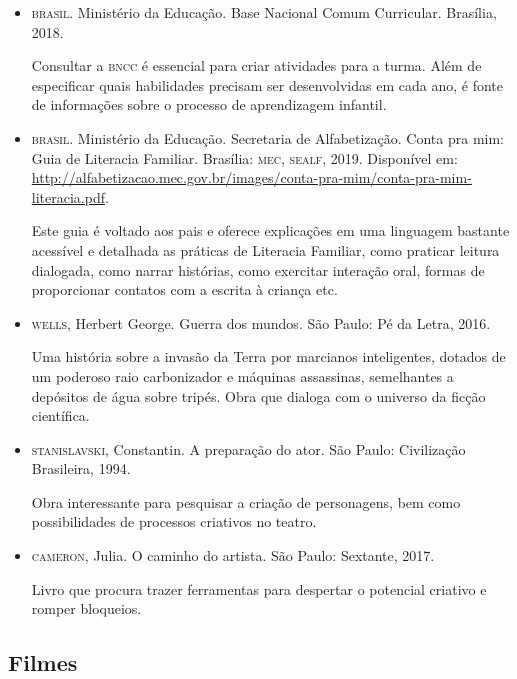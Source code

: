 \documentclass[11pt]{extarticle}
\begin{document}
\begin{itemize}
\item \textsc{brasil}. Ministério da Educação. Base Nacional Comum Curricular. Brasília, 2018.

Consultar a \textsc{bncc} é essencial para criar atividades para a turma. Além de especificar quais habilidades precisam ser desenvolvidas em cada ano, é fonte de informações sobre o processo de aprendizagem infantil. 

\item \textsc{brasil}. Ministério da Educação. Secretaria de Alfabetização. Conta pra mim: Guia de Literacia Familiar. 
Brasília: \textsc{mec, sealf}, 2019. Disponível em: \url{http://alfabetizacao.mec.gov.br/images/conta-pra-mim/conta-pra-mim-literacia.pdf}.

Este guia é voltado aos pais e oferece explicações em uma linguagem bastante acessível e detalhada as práticas de Literacia Familiar, como praticar leitura dialogada, como narrar histórias, como exercitar interação oral, formas de proporcionar contatos com a escrita à criança etc. 
 
\item \textsc{wells}, Herbert George. Guerra dos mundos. São Paulo: Pé da Letra, 2016.

Uma história sobre a invasão da Terra por marcianos inteligentes, dotados de um poderoso raio carbonizador e máquinas assassinas, semelhantes a depósitos de água sobre tripés. Obra que dialoga com o universo da ficção científica.

\item \textsc{stanislavski}, Constantin. A preparação do ator. São Paulo: Civilização Brasileira, 1994.

Obra interessante para pesquisar a criação de personagens, bem como possibilidades de processos criativos no teatro. 

\item \textsc{cameron}, Julia. O caminho do artista. São Paulo: Sextante, 2017.

Livro que procura trazer ferramentas para despertar o potencial criativo e romper bloqueios.

\end{itemize}

\subsection{Filmes}
\end{document}
